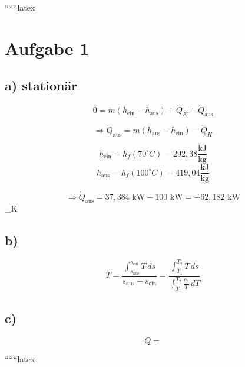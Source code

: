 
``````latex


\section*{Aufgabe 1}

\subsection*{a) stationär}

\[
0 = \dot{m} (h_{\text{ein}} - h_{\text{aus}}) + \dot{Q}_K + \dot{Q}_{\text{aus}}
\]

\[
\Rightarrow \dot{Q}_{\text{aus}} = \dot{m} (h_{\text{aus}} - h_{\text{ein}}) - \dot{Q}_K
\]

\[
h_{\text{ein}} = h_f (70^\circ C) = 292,38 \frac{\text{kJ}}{\text{kg}}
\]
\[
h_{\text{aus}} = h_f (100^\circ C) = 419,04 \frac{\text{kJ}}{\text{kg}}
\]

\[
\Rightarrow \dot{Q}_{\text{aus}} = 37,384 \text{ kW} - 100 \text{ kW} = -62,182 \text{ kW}
\]
 _K 

\subsection*{b)}

\[
\bar{T} = \frac{\int_{s_{\text{aus}}}^{s_{\text{ein}}} T \, ds}{s_{\text{aus}} - s_{\text{ein}}} = \frac{\int_{T_1}^{T_2} T \, ds}{\int_{T_1}^{T_2} \frac{c_p}{T} \, dT}
\]

\subsection*{c)}

\[
Q = 
\]

``````latex


